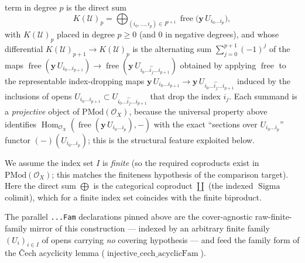 \begin{definition}
  term in degree \(p\) is the direct sum
  \[
    K(\mathcal{U})_p
      = \bigoplus_{(i_0, \ldots, i_p) \in I^{p+1}}
        \operatorname{free}\bigl(\mathbf{y}\,U_{i_0 \ldots i_p}\bigr),
  \]
  with \(K(\mathcal{U})_p\) placed in degree \(p \geq 0\) (and \(0\) in negative
  degrees), and whose differential \(K(\mathcal{U})_{p+1} \to K(\mathcal{U})_p\) is
  the alternating sum \(\sum_{j=0}^{p+1} (-1)^j\) of the maps
  \(\operatorname{free}(\mathbf{y}\,U_{i_0 \ldots i_{p+1}}) \to
  \operatorname{free}(\mathbf{y}\,U_{i_0 \ldots \widehat{i_j} \ldots i_{p+1}})\)
  obtained by applying \(\operatorname{free}\) to the representable index-dropping
  maps \(\mathbf{y}\,U_{i_0 \ldots i_{p+1}} \to \mathbf{y}\,U_{i_0 \ldots
  \widehat{i_j} \ldots i_{p+1}}\) induced by the inclusions of opens
  \(U_{i_0 \ldots i_{p+1}} \subset U_{i_0 \ldots \widehat{i_j} \ldots i_{p+1}}\)
  that drop the index \(i_j\). Each summand is a \emph{projective} object of
  \(\mathrm{PMod}(\mathcal{O}_X)\), because the universal property above identifies
  \(\operatorname{Hom}_{\mathcal{O}_X}(\operatorname{free}(\mathbf{y}\,U_{i_0 \ldots
  i_p}), -)\) with the exact ``sections over \(U_{i_0 \ldots i_p}\)'' functor
  \((-)(U_{i_0 \ldots i_p})\); this is the structural feature exploited below.

  We assume the index set \(I\) is \emph{finite} (so the required coproducts exist in
  \(\mathrm{PMod}(\mathcal{O}_X)\); this matches the finiteness hypothesis of the
  comparison target). Here the direct sum \(\bigoplus\) is the categorical coproduct
  \(\coprod\) (the indexed \(\operatorname{Sigma}\) colimit), which for a finite index
  set coincides with the finite biproduct.

  The parallel \texttt{...Fam} declarations pinned above are the cover-agnostic
  raw-finite-family mirror of this construction — indexed by an arbitrary finite
  family \((U_i)_{i \in I}\) of opens carrying \emph{no} covering hypothesis — and
  feed the family form of the {\v C}ech acyclicity lemma
  (\(\operatorname{injective\_cech\_acyclicFam}\)).
\end{definition}

